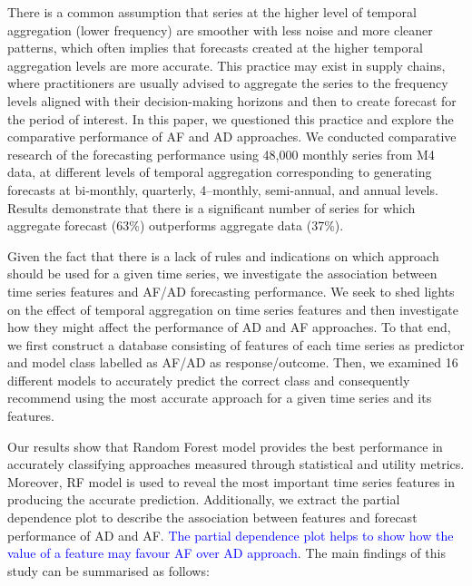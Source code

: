 \documentclass[preprint, 3p,
authoryear]{elsarticle} %
\begin{document}
There is a common assumption that series at the higher level of temporal
aggregation (lower frequency) are smoother with less noise and more
cleaner patterns, which often implies that forecasts created at the
higher temporal aggregation levels are more accurate. This practice may
exist in supply chains, where practitioners are usually advised to
aggregate the series to the frequency levels aligned with their
decision-making horizons and then to create forecast for the period of
interest. In this paper, we questioned this practice and explore the
comparative performance of AF and AD approaches. We conducted
comparative research of the forecasting performance using 48,000 monthly
series from M4 data, at different levels of temporal aggregation
corresponding to generating forecasts at bi-monthly, quarterly,
4--monthly, semi-annual, and annual levels. Results demonstrate that
there is a significant number of series for which aggregate forecast
(63\%) outperforms aggregate data (37\%).

Given the fact that there is a lack of rules and indications on which
approach should be used for a given time series, we investigate the
association between time series features and AF/AD forecasting
performance. We seek to shed lights on the effect of temporal
aggregation on time series features and then investigate how they might
affect the performance of AD and AF approaches. To that end, we first
construct a database consisting of features of each time series as
predictor and model class labelled as AF/AD as response/outcome. Then,
we examined 16 different models to accurately predict the correct class
and consequently recommend using the most accurate approach for a given
time series and its features.

Our results show that Random Forest model provides the best performance
in accurately classifying approaches measured through statistical and
utility metrics. Moreover, RF model is used to reveal the most important
time series features in producing the accurate prediction. Additionally,
we extract the partial dependence plot to describe the association
between features and forecast performance of AD and AF.
\textcolor{blue}{The partial dependence plot helps to show how the value of a feature may favour AF over AD approach}.
The main findings of this study can be summarised as follows:
\end{document}
